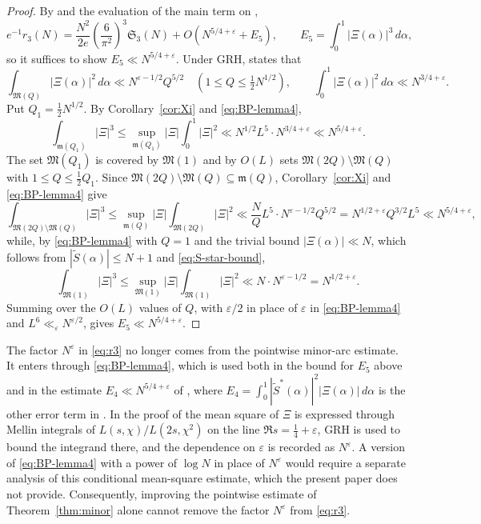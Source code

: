\documentclass[11pt]{amsart}
\numberwithin{equation}{section}
\numberwithin{figure}{section}
\theoremstyle{definition}
\newcommand{\eps}{\varepsilon}
\newcommand{\Major}{\mathfrak{M}}
\newcommand{\Minor}{\mathfrak{m}}
\begin{document}
\begin{proof}
By \cite[(38), (42), (45)]{BP} and the evaluation of the main term on
\cite[p.~610]{BP},
\[
  e^{-1}r_3(N)=\frac{N^2}{2e}\left(\frac6{\pi^2}\right)^3\mathfrak S_3(N)
  +O(N^{5/4+\eps}+E_5),
  \qquad E_5=\int_0^1|\Xi(\alpha)|^3\,d\alpha,
\]
so it suffices to show $E_5\ll N^{5/4+\eps}$.  Under GRH,
\cite[Lemma~4]{BP} states that
\begin{equation}\label{eq:BP-lemma4}
  \int_{\Major(Q)}|\Xi(\alpha)|^2\,d\alpha\ll N^{\eps-1/2}Q^{5/2}
  \quad\left(1\le Q\le\tfrac12N^{1/2}\right),
  \qquad
  \int_0^1|\Xi(\alpha)|^2\,d\alpha\ll N^{3/4+\eps}.
\end{equation}
Put $Q_1=\frac12N^{1/2}$.  By Corollary~\ref{cor:Xi} and
\eqref{eq:BP-lemma4},
\[
  \int_{\Minor(Q_1)}|\Xi|^3
  \le\sup_{\Minor(Q_1)}|\Xi|\int_0^1|\Xi|^2
  \ll N^{1/2}L^5\cdot N^{3/4+\eps}\ll N^{5/4+\eps}.
\]
The set $\Major(Q_1)$ is covered by $\Major(1)$ and by $O(L)$ sets
$\Major(2Q)\setminus\Major(Q)$ with $1\le Q\le\frac12Q_1$.  Since
$\Major(2Q)\setminus\Major(Q)\subseteq\Minor(Q)$, Corollary~\ref{cor:Xi}
and \eqref{eq:BP-lemma4} give
\[
  \int_{\Major(2Q)\setminus\Major(Q)}|\Xi|^3
  \le\sup_{\Minor(Q)}|\Xi|\int_{\Major(2Q)}|\Xi|^2
  \ll\frac NQL^5\cdot N^{\eps-1/2}Q^{5/2}
  =N^{1/2+\eps}Q^{3/2}L^5\ll N^{5/4+\eps},
\]
while, by \eqref{eq:BP-lemma4} with $Q=1$ and the trivial bound
$|\Xi(\alpha)|\ll N$, which follows from $|\tilde S(\alpha)|\le N+1$ and
\eqref{eq:S-star-bound},
\[
  \int_{\Major(1)}|\Xi|^3\le\sup_{\Major(1)}|\Xi|\int_{\Major(1)}|\Xi|^2
  \ll N\cdot N^{\eps-1/2}=N^{1/2+\eps}.
\]
Summing over the $O(L)$ values of $Q$, with $\eps/2$ in place of $\eps$ in
\eqref{eq:BP-lemma4} and $L^6\ll_{\eps}N^{\eps/2}$, gives
$E_5\ll N^{5/4+\eps}$.
\end{proof}

The factor $N^{\eps}$ in \eqref{eq:r3} no longer comes from the pointwise
minor-arc estimate.  It enters through \eqref{eq:BP-lemma4}, which is used
both in the bound for $E_5$ above and in the estimate
$E_4\ll N^{5/4+\eps}$ of \cite[(42)]{BP}, where
$E_4=\int_0^1|\tilde S^*(\alpha)|^2|\Xi(\alpha)|\,d\alpha$ is the other
error term in \cite[(38)]{BP}.  In the proof of
\cite[Lemma~3]{BP} the mean square of $\Xi$ is expressed through Mellin
integrals of $L(s,\chi)/L(2s,\chi^2)$ on the line $\Re s=\frac14+\eps$,
GRH is used to bound the integrand there, and the dependence on $\eps$ is
recorded as $N^{\eps}$.  A version of \eqref{eq:BP-lemma4} with a power of
$\log N$ in place of $N^{\eps}$ would require a separate analysis of this
conditional mean-square estimate, which the present paper does not
provide.  Consequently, improving the pointwise estimate of
Theorem~\ref{thm:minor} alone cannot remove the factor $N^{\eps}$ from
\eqref{eq:r3}.
\end{document}
